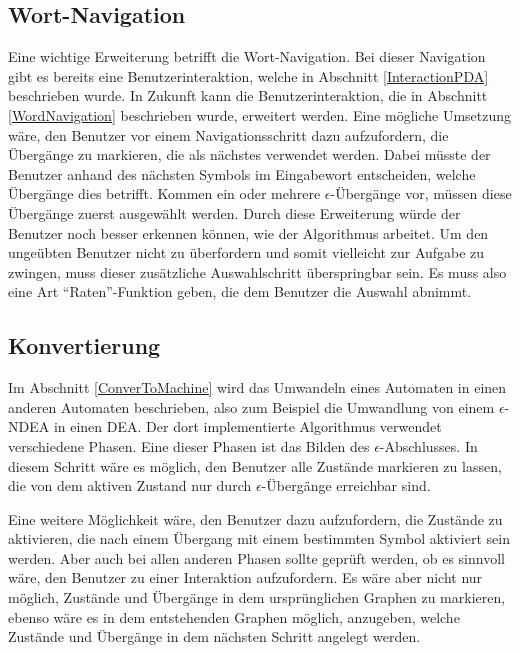 \subsection{Wort-Navigation}\label{PerspectiveWordNavigation}
Eine wichtige Erweiterung betrifft die Wort-Navigation. Bei dieser Navigation
gibt es bereits eine Benutzerinteraktion, welche in Abschnitt
\ref{InteractionPDA} beschrieben wurde. In Zukunft kann die Benutzerinteraktion,
die in Abschnitt \ref{WordNavigation} beschrieben wurde, erweitert werden. Eine
mögliche Umsetzung wäre, den Benutzer vor einem Navigationsschritt dazu
aufzufordern, die Übergänge zu markieren, die als nächstes verwendet werden.
Dabei müsste der Benutzer anhand des nächsten Symbols im Eingabewort entscheiden,
welche Übergänge dies betrifft. Kommen ein oder mehrere $\epsilon$-Übergänge vor,
müssen diese Übergänge zuerst ausgewählt werden. Durch diese Erweiterung würde
der Benutzer noch besser erkennen können, wie der Algorithmus arbeitet. Um den
ungeübten Benutzer nicht zu überfordern und somit vielleicht zur Aufgabe zu
zwingen, muss dieser zusätzliche Auswahlschritt überspringbar sein. Es muss also
eine Art "`Raten"'-Funktion geben, die dem Benutzer die Auswahl
abnimmt.\vspace{10pt}


\subsection{Konvertierung}\label{PerspectiveConvertTo}
Im Abschnitt \ref{ConverToMachine} wird das Umwandeln eines Automaten in einen
anderen Automaten beschrieben, also zum Beispiel die Umwandlung von einem
$\epsilon$-NDEA in einen DEA. Der dort implementierte Algorithmus verwendet
verschiedene Phasen. Eine dieser Phasen ist das Bilden des
$\epsilon$-Abschlusses. In diesem Schritt wäre es möglich, den Benutzer alle
Zustände markieren zu lassen, die von dem aktiven Zustand nur durch
$\epsilon$-Übergänge erreichbar sind.\vspace{10pt}

Eine weitere Möglichkeit wäre, den Benutzer dazu aufzufordern, die Zustände zu
aktivieren, die nach einem Übergang mit einem bestimmten Symbol aktiviert sein
werden. Aber auch bei allen anderen Phasen sollte geprüft werden, ob es sinnvoll
wäre, den Benutzer zu einer Interaktion aufzufordern. Es wäre aber nicht nur
möglich, Zustände und Übergänge in dem ursprünglichen Graphen zu markieren,
ebenso wäre es in dem entstehenden Graphen möglich, anzugeben, welche Zustände und
Übergänge in dem nächsten Schritt angelegt werden.\vspace{10pt}


